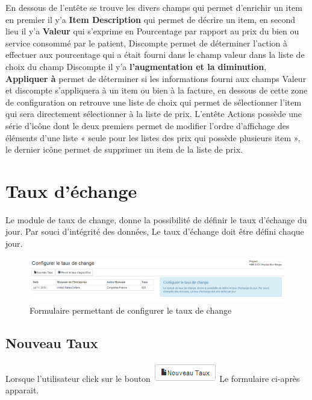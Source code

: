 \documentclass[12pt,a4paper]{report}
\begin{document}
En dessous de l'entête se trouve les divers champs qui permet d'enrichir un item en premier il y'a \textbf{Item Description} qui permet de décrire un item, en second lieu il y'a \textbf{Valeur} qui s'exprime en Pourcentage par rapport au prix du bien ou service consommé par le patient, Discompte permet de déterminer l'action à effectuer aux pourcentage qui a était fourni dans le champ valeur dans la liste de choix du champ Discompte il y'a \textbf{l'augmentation et la diminution}, \textbf{Appliquer à} permet de déterminer si les informations fourni   aux champs Valeur et discompte s'appliquera à un item ou bien à la facture, en dessous de cette zone de configuration on retrouve une liste de choix qui permet de sélectionner l'item qui sera directement sélectionner à la liste de prix. L'entête Actions possède une série d'icône dont le deux premiers permet de modifier l'ordre d'affichage des éléments d'une liste « seule pour les listes des prix qui possède plusieurs item », le dernier icône permet de supprimer un item de la liste de prix.
\newpage
\section{Taux d'échange}
Le module de taux de change, donne la possibilité de définir le taux d'échange du jour. Par souci d'intégrité des données, Le taux d'échange doit être défini chaque jour.


\begin{figure}[h]
\begin{center}
\includegraphics[width=16cm]{pic/FormulaireConfigRate.png}
\end{center}
\caption{Formulaire permettant de configurer le taux de change}
\label{Formulaire permettant de configurer le taux de change}
\end{figure}

\subsection{Nouveau Taux}
Lorsque l'utilisateur click sur le bouton \includegraphics[scale=0.7]{pic/NouveauTaux.png}
 Le formulaire ci-après apparait.
\end{document}
